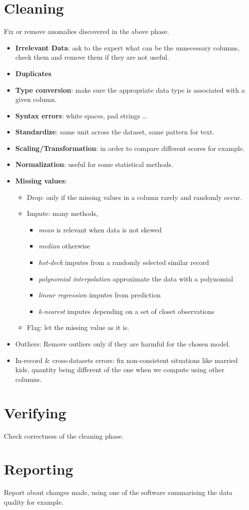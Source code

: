 \section{Cleaning} 
Fix or remove anomalies discovered in the above phase.
\begin{itemize}
    \item \textbf{Irrelevant Data}: ask to the expert what can be the unnecessary columns,
        check them and remove them if they are not useful.
    \item \textbf{Duplicates}
    \item \textbf{Type conversion}: make sure the appropriate data type is associated with
        a given column.
    \item \textbf{Syntax errors}: white spaces, pad strings \dots
    \item \textbf{Standardize}: same unit across the dataset, same pattern for text.
    \item \textbf{Scaling/Transformation}: in order to compare different scores for 
        example.
    \item \textbf{Normalization}: useful for some statistical methods.
    \item \textbf{Missing values}: 
        \begin{itemize}
            \item Drop: only if the missing values in a column rarely and randomly occur.
            \item Impute: many methods,  
                \begin{itemize}
                    \item \textit{mean} is relevant when data is not skewed
                    \item \textit{median} otherwise
                    \item \textit{hot-deck} imputes from a randomly selected similar record
                    \item \textit{polynomial interpolation} approximate the data with a polynomial 
                    \item \textit{linear regression} imputes from prediction 
                    \item \textit{k-nearest} imputes depending on a set of closet observations
                \end{itemize}
            \item Flag: let the missing value as it is.
        \end{itemize}
    \item Outliers: Remove outliers only if they are harmful for the chosen model.
    \item In-record \& cross-datasets errors: fix non-consistent situations like married 
        kids, quantity being different of the one when we compute using other columns.
\end{itemize}

\section{Verifying}
Check correctness of the cleaning phase.
\section{Reporting} 
Report about changes made, using one of the software summarising the data quality for 
example.
